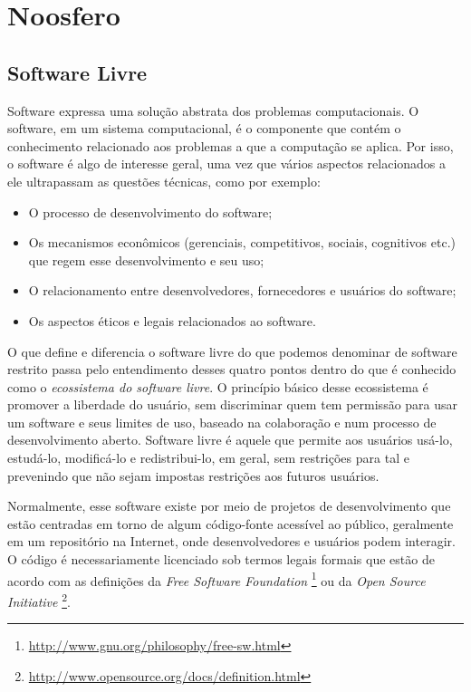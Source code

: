 \chapter{Noosfero}


\section{Software Livre}

Software expressa uma solução abstrata dos problemas computacionais.
%
O software, em um sistema computacional, é o componente que contém o
conhecimento relacionado aos problemas a que a computação se aplica.
%
Por isso, o software é algo de interesse geral, uma vez que vários aspectos
relacionados a ele ultrapassam as questões técnicas, como por exemplo:
\begin{itemize}
\item O processo de desenvolvimento do software; 
\item Os mecanismos econômicos (gerenciais, competitivos, sociais, cognitivos etc.)
que regem esse desenvolvimento e seu uso;
\item O relacionamento entre desenvolvedores, fornecedores e usuários do
        software;
\item Os aspectos éticos e legais relacionados ao software.
\end{itemize}

O que define e diferencia o software livre do que podemos denominar de
software restrito passa pelo entendimento desses quatro pontos dentro do que é
conhecido como o \emph{ecossistema do software livre}.
%
O princípio básico desse ecossistema é promover a liberdade do usuário,
sem discriminar quem tem permissão para usar um software e seus limites de uso,
baseado na colaboração e num processo de desenvolvimento aberto.
%
Software livre é aquele que permite aos usuários usá-lo, estudá-lo, modificá-lo e
redistribui-lo, em geral, sem restrições para tal e prevenindo que não sejam
impostas restrições aos futuros usuários.
%

Normalmente, esse software existe por meio de projetos de desenvolvimento
que estão centradas em torno de algum código-fonte acessível ao público,
geralmente em um repositório na Internet, onde desenvolvedores e usuários
podem interagir.
%
O código é necessariamente licenciado sob termos legais formais que estão de
acordo com as definições da \textit{Free Software Foundation}
\footnote{\url{http://www.gnu.org/philosophy/free-sw.html}} ou da
\textit{Open Source Initiative}
\footnote{\url{http://www.opensource.org/docs/definition.html}}.


